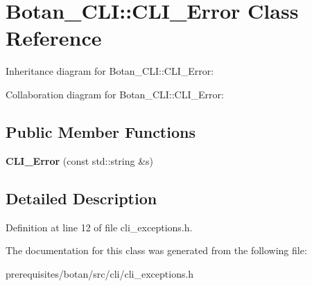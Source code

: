 \hypertarget{class_botan___c_l_i_1_1_c_l_i___error}{}\section{Botan\+\_\+\+C\+LI\+:\+:C\+L\+I\+\_\+\+Error Class Reference}
\label{class_botan___c_l_i_1_1_c_l_i___error}


Inheritance diagram for Botan\+\_\+\+C\+LI\+:\+:C\+L\+I\+\_\+\+Error\+:


Collaboration diagram for Botan\+\_\+\+C\+LI\+:\+:C\+L\+I\+\_\+\+Error\+:
\subsection*{Public Member Functions}
\begin{DoxyCompactItemize}
\item 
\mbox{\label{class_botan___c_l_i_1_1_c_l_i___error_a51c527c9fff5cd07300f1593ffeef3d8}} 
{\bfseries C\+L\+I\+\_\+\+Error} (const std\+::string \&s)
\end{DoxyCompactItemize}


\subsection{Detailed Description}


Definition at line 12 of file cli\+\_\+exceptions.\+h.



The documentation for this class was generated from the following file\+:\begin{DoxyCompactItemize}
\item 
prerequisites/botan/src/cli/cli\+\_\+exceptions.\+h\end{DoxyCompactItemize}
